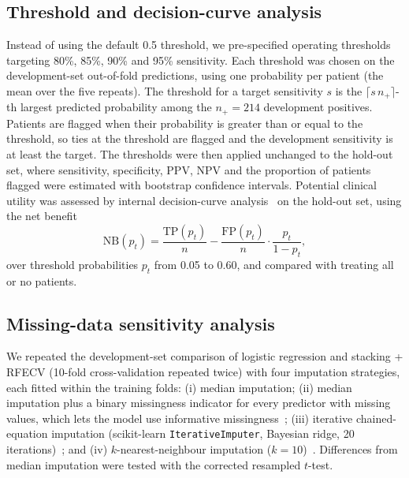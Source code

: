 \subsection{Threshold and decision-curve analysis}
Instead of using the default 0.5 threshold, we pre-specified operating thresholds targeting 80\%, 85\%, 90\% and 95\% sensitivity. Each threshold was chosen on the development-set out-of-fold predictions, using one probability per patient (the mean over the five repeats). The threshold for a target sensitivity $s$ is the $\lceil s\,n_+\rceil$-th largest predicted probability among the $n_+ = 214$ development positives. Patients are flagged when their probability is greater than or equal to the threshold, so ties at the threshold are flagged and the development sensitivity is at least the target. The thresholds were then applied unchanged to the hold-out set, where sensitivity, specificity, PPV, NPV and the proportion of patients flagged were estimated with bootstrap confidence intervals. Potential clinical utility was assessed by internal decision-curve analysis~\cite{vickers2006dca} on the hold-out set, using the net benefit
\begin{equation}
  \mathrm{NB}(p_t) = \frac{\mathrm{TP}(p_t)}{n} - \frac{\mathrm{FP}(p_t)}{n}\cdot\frac{p_t}{1-p_t},
\end{equation}
over threshold probabilities $p_t$ from 0.05 to 0.60, and compared with treating all or no patients.

\subsection{Missing-data sensitivity analysis}
\label{sec:missing-methods}
We repeated the development-set comparison of logistic regression and stacking + RFECV (10-fold cross-validation repeated twice) with four imputation strategies, each fitted within the training folds: (i) median imputation; (ii) median imputation plus a binary missingness indicator for every predictor with missing values, which lets the model use informative missingness~\cite{sperrin2020missing}; (iii) iterative chained-equation imputation (scikit-learn \texttt{IterativeImputer}, Bayesian ridge, 20 iterations)~\cite{vanbuuren2011mice}; and (iv) $k$-nearest-neighbour imputation ($k=10$)~\cite{troyanskaya2001knn}. Differences from median imputation were tested with the corrected resampled $t$-test.

